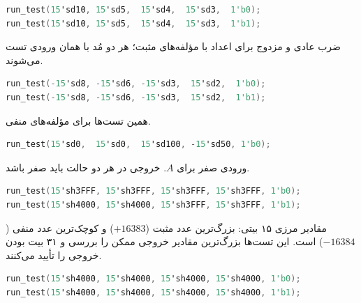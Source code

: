 \vspace{0.8cm}
\begin{latin}
    \begin{lstlisting}[language=Verilog]
run_test(15'sd10, 15'sd5,  15'sd4,  15'sd3,  1'b0);
run_test(15'sd10, 15'sd5,  15'sd4,  15'sd3,  1'b1);
\end{lstlisting}
\end{latin}

\vspace{-0.2cm}
ضرب عادی و مزدوج برای اعداد با مؤلفه‌های مثبت؛ هر دو مُد  با همان ورودی تست می‌شوند.
\vspace{0.8cm}

\begin{latin}
    \begin{lstlisting}[language=Verilog]
run_test(-15'sd8, -15'sd6, -15'sd3,  15'sd2,  1'b0);
run_test(-15'sd8, -15'sd6, -15'sd3,  15'sd2,  1'b1);
\end{lstlisting}
\end{latin}

\vspace{-0.2cm}
همین تست‌ها برای مؤلفه‌های منفی.
\vspace{0.8cm}

\begin{latin}
    \begin{lstlisting}[language=Verilog]
run_test(15'sd0,  15'sd0,  15'sd100, -15'sd50, 1'b0);
\end{lstlisting}
\end{latin}

\vspace{-0.2cm}
ورودی صفر برای $A$. خروجی در هر دو حالت  باید صفر باشد.

\pagebreak

\begin{latin}
    \begin{lstlisting}[language=Verilog]
run_test(15'sh3FFF, 15'sh3FFF, 15'sh3FFF, 15'sh3FFF, 1'b0);
run_test(15'sh4000, 15'sh4000, 15'sh3FFF, 15'sh3FFF, 1'b1);
\end{lstlisting}
\end{latin}

\vspace{-0.2cm}
مقادیر مرزی ۱۵ بیتی:  بزرگ‌ترین عدد مثبت ($+16383$) و  کوچک‌ترین عدد منفی ($-16384$) است. این تست‌ها بزرگ‌ترین مقادیر خروجی ممکن را بررسی و ۳۱ بیت بودن خروجی را تأیید می‌کنند.
\vspace{0.8cm}

\begin{latin}
    \begin{lstlisting}[language=Verilog]
run_test(15'sh4000, 15'sh4000, 15'sh4000, 15'sh4000, 1'b0);
run_test(15'sh4000, 15'sh4000, 15'sh4000, 15'sh4000, 1'b1);
\end{lstlisting}
\end{latin}

